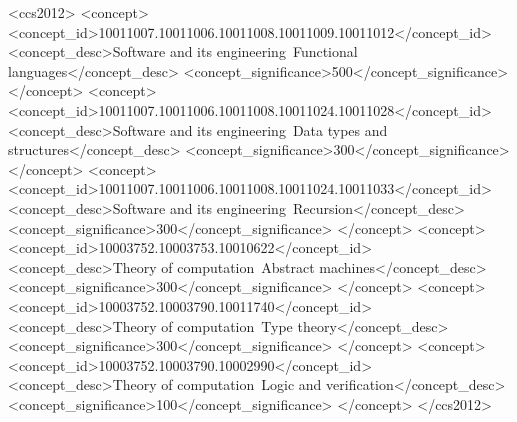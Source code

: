 \begin{CCSXML}
<ccs2012>
<concept>
<concept_id>10011007.10011006.10011008.10011009.10011012</concept_id>
<concept_desc>Software and its engineering~Functional languages</concept_desc>
<concept_significance>500</concept_significance>
</concept>
<concept>
<concept_id>10011007.10011006.10011008.10011024.10011028</concept_id>
<concept_desc>Software and its engineering~Data types and structures</concept_desc>
<concept_significance>300</concept_significance>
</concept>
<concept>
<concept_id>10011007.10011006.10011008.10011024.10011033</concept_id>
<concept_desc>Software and its engineering~Recursion</concept_desc>
<concept_significance>300</concept_significance>
</concept>
<concept>
<concept_id>10003752.10003753.10010622</concept_id>
<concept_desc>Theory of computation~Abstract machines</concept_desc>
<concept_significance>300</concept_significance>
</concept>
<concept>
<concept_id>10003752.10003790.10011740</concept_id>
<concept_desc>Theory of computation~Type theory</concept_desc>
<concept_significance>300</concept_significance>
</concept>
<concept>
<concept_id>10003752.10003790.10002990</concept_id>
<concept_desc>Theory of computation~Logic and verification</concept_desc>
<concept_significance>100</concept_significance>
</concept>
</ccs2012>
\end{CCSXML}


